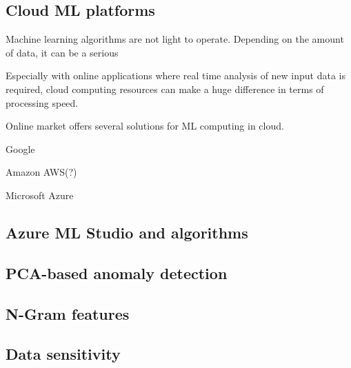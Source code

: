 \subsection{Cloud ML platforms}\label{subsec:bg-cloud-ml-platforms}

Machine learning algorithms are not light to operate.
Depending on the amount of data,
it can be a serious %

Especially with online applications
where real time analysis of new input data is required,
cloud computing resources can make a huge difference
in terms of processing speed. %

Online market offers several solutions for ML computing in cloud.

Google

Amazon AWS(?)

Microsoft Azure\cite{altexsoft}




\subsection{Azure ML Studio and algorithms}\label{subsec:bg-azure-ml-studio-algorithms}




\subsection{PCA-based anomaly detection}\label{subsec:bg-pca-ada}



\subsection{N-Gram features}\label{subsec:bg-ngram-features}


\subsection{Data sensitivity}\label{subsec:bg-data-sensitivity}


